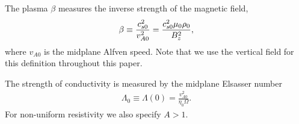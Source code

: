 The plasma $\beta$ measures the inverse strength of the  
magnetic field,  
\begin{align}
  \beta \equiv \frac{c_{s0}^2}{v_{A0}^2} =
  \frac{c_{s0}^2\mu_0\rho_0}{B_z^2},  
\end{align}
where $v_{A0}$ is the midplane Alfven speed. Note that we use 
the vertical field for this definition throughout this paper. 

The strength of conductivity is measured by the midplane Elsasser
number   
\begin{align}
  \Lambda_0 \equiv\Lambda(0) =  \frac{v_{A0}^2}{\eta_0\Omega}. 
\end{align}
For non-uniform resistivity we also specify $A > 1$. 
